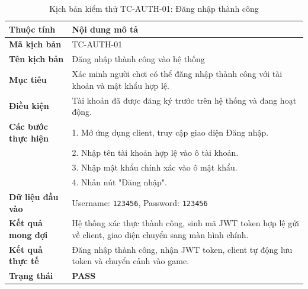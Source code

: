 \documentclass[../Project.tex]{subfiles}
\begin{document}
\begin{table}[H]
\centering
\begin{tabular}{|l|p{10.5cm}|}
\hline
\textbf{Thuộc tính} & \textbf{Nội dung mô tả} \\ \hline
\textbf{Mã kịch bản} & TC-AUTH-01 \\ \hline
\textbf{Tên kịch bản} & Đăng nhập thành công vào hệ thống \\ \hline
\textbf{Mục tiêu} & Xác minh người chơi có thể đăng nhập thành công với tài khoản và mật khẩu hợp lệ. \\ \hline
\textbf{Điều kiện} & Tài khoản đã được đăng ký trước trên hệ thống và đang hoạt động. \\ \hline
\textbf{Các bước thực hiện} & 
1. Mở ứng dụng client, truy cập giao diện Đăng nhập. \\
& 2. Nhập tên tài khoản hợp lệ vào ô tài khoản. \\
& 3. Nhập mật khẩu chính xác vào ô mật khẩu. \\
& 4. Nhấn nút "Đăng nhập". \\ \hline
\textbf{Dữ liệu đầu vào} & Username: \texttt{123456}, Password: \texttt{123456} \\ \hline
\textbf{Kết quả mong đợi} & Hệ thống xác thực thành công, sinh mã JWT token hợp lệ gửi về client, giao diện chuyển sang màn hình chính. \\ \hline
\textbf{Kết quả thực tế} & Đăng nhập thành công, nhận JWT token, client tự động lưu token và chuyển cảnh vào game. \\ \hline
\textbf{Trạng thái} & \textbf{PASS} \\ \hline
\end{tabular}
\caption{Kịch bản kiểm thử TC-AUTH-01: Đăng nhập thành công}
\label{tab:tc_auth_01}
\end{table}
\end{document}
